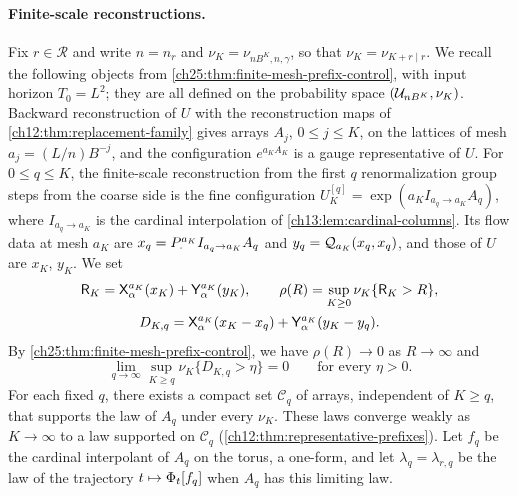 \paragraph{Finite-scale reconstructions.}
Fix $r\in\mathcal R$ and write $n=n_r$ and $\nu_K=\nu_{nB^K,n,\gamma}$, so that $\nu_K=\nu_{K+r\mid r}$. We recall the following objects from \cref{ch25:thm:finite-mesh-prefix-control}, with input horizon $T_0=L^2$; they are all defined on the probability space $(\mathcal U_{nB^K},\nu_K)$. Backward reconstruction of $U$ with the reconstruction maps of \cref{ch12:thm:replacement-family} gives arrays $A_j$, $0\le j\le K$, on the lattices of mesh $a_j=(L/n)B^{-j}$, and the configuration $e^{a_KA_K}$ is a gauge representative of $U$. For $0\le q\le K$, the finite-scale reconstruction from the first $q$ renormalization group steps from the coarse side is the fine configuration $U_K^{[q]}=\exp(a_KI_{a_q\to a_K}A_q)$, where $I_{a_q\to a_K}$ is the cardinal interpolation of \cref{ch13:lem:cardinal-columns}. Its flow data at mesh $a_K$ are $x_q=P_{\cdot}^{a_K}I_{a_q\to a_K}A_q$ and $y_q=\mathcal Q_{a_K}(x_q,x_q)$, and those of $U$ are $x_K$, $y_K$. We set
\[
 \begin{gathered}
 \mathsf R_K=\mathsf X_{\alpha}^{a_K}(x_K)+\mathsf Y_{\alpha}^{a_K}(y_K),\qquad \rho(R)=\sup_{K\ge0}\nu_K\{\mathsf R_K>R\},\\
 D_{K,q}=\mathsf X_{\alpha}^{a_K}(x_K-x_q)+\mathsf Y_{\alpha}^{a_K}(y_K-y_q).
 \end{gathered}
\]
By \cref{ch25:thm:finite-mesh-prefix-control}, we have $\rho(R)\to0$ as $R\to\infty$ and
\begin{equation}\label{ch26:eq:finite-scale-tail}
 \lim_{q\to\infty}\sup_{K\ge q}\nu_K\{D_{K,q}>\eta\}=0\qquad\text{for every }\eta>0 .
\end{equation}
For each fixed $q$, there exists a compact set $\mathcal C_q$ of arrays, independent of $K\ge q$, that supports the law of $A_q$ under every $\nu_K$. These laws converge weakly as $K\to\infty$ to a law supported on $\mathcal C_q$ (\cref{ch12:thm:representative-prefixes}). Let $f_q$ be the cardinal interpolant of $A_q$ on the torus, a one-form, and let $\lambda_q=\lambda_{r,q}$ be the law of the trajectory $t\mapsto\Phi_t[f_q]$ when $A_q$ has this limiting law.

